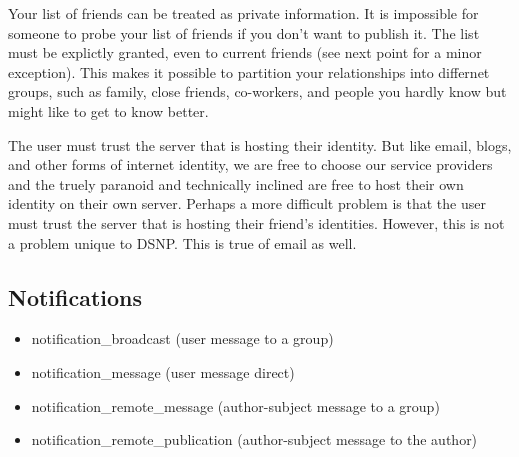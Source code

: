 \documentclass[letterpaper,11pt,oneside]{article}
\begin{document}
Your list of friends can be treated as private information. It is impossible
for someone to probe your list of friends if you don't want to publish it.
The list must be explictly granted, even to current friends (see next point
for a minor exception). This makes it possible to partition your
relationships into differnet groups, such as family, close friends,
co-workers, and people you hardly know but might like to get to know better.

The user must trust the server that is hosting their identity. But like email,
blogs, and other forms of internet identity, we are free to choose our service
providers and the truely paranoid and technically inclined are free to host
their own identity on their own server. Perhaps a more difficult problem is
that the user must trust the server that is hosting their friend's identities.
However, this is not a problem unique to DSNP. This is true of email as well.

\subsection{Notifications}

\begin{itemize}
\item notification\_broadcast           (user message to a group)
\item notification\_message             (user message direct)
\item notification\_remote\_message     (author-subject message to a group)
\item notification\_remote\_publication (author-subject message to the author)
\end{itemize}
\end{document}
